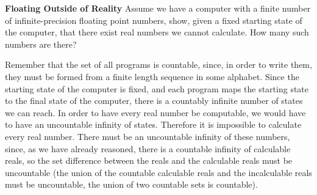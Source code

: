 \question \textbf{Floating Outside of Reality}\newline
Assume we have a computer with a finite number of infinite-precision floating point numbers, show, given a fixed starting state of the computer, that there exist real numbers we cannot calculate. How many such numbers are there?
\begin{solution}
Remember that the set of all programs is countable, since, in order to write them, they must be formed from a finite length sequence in some alphabet. Since the starting state of the computer is fixed, and each program maps the starting state to the final state of the computer, there is a countably infinite number of states we can reach. In order to have every real number be computable, we would have to have an uncountable infinity of states. Therefore it is impossible to calculate every real number.\newline
There must be an uncountable infinity of these numbers, since, as we have already reasoned, there is a countable infinity of calculable reals, so the set difference between the reals and the calculable reals must be uncountable (the union of the countable calculable reals and the incalculable reals must be uncountable, the union of two countable sets is countable).

\end{solution}
